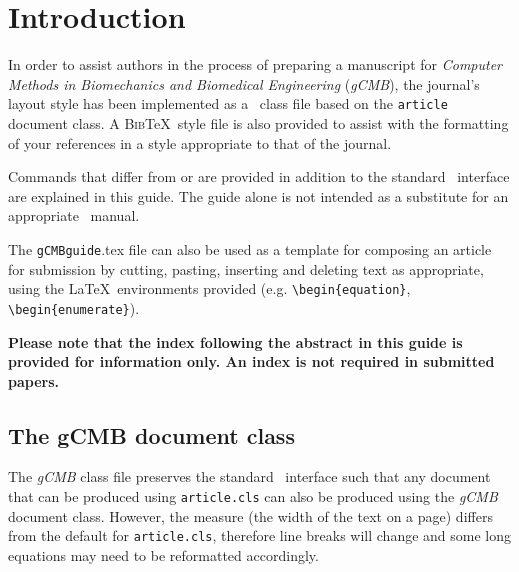 \documentclass{gCMB2e}
\begin{document}
\section{Introduction}

In order to assist authors in the process of preparing a manuscript for {\itshape Computer Methods in Biomechanics and Biomedical Engineering} ({\it gCMB}), the journal's layout style has been implemented as a \LaTeXe\ class file based on the {\tt article} document class. A \textsc{Bib}\TeX\ style file is also provided to assist with the formatting of your references in a style appropriate to that of the journal.

Commands that differ from or are provided in addition to the standard \LaTeXe\ interface are explained in this guide. The guide alone is not intended as a substitute for an appropriate \LaTeXe\ manual.

The {\tt gCMBguide}.tex file can also be used as a template for composing an article for submission by cutting, pasting, inserting and
deleting text as appropriate, using the \LaTeX\ environments provided (e.g. \verb"\begin{equation}", \verb"\begin{enumerate}").

{\bf{Please note that the index following the abstract in this guide is provided for information only. An index is not required in submitted papers.}}


\subsection{The {\bi gCMB} document class}\label{S1.1}

The {\it gCMB} class file preserves the standard \LaTeXe\ interface such that any document that can
be produced using {\tt article.cls} can also be produced using the {\it gCMB} document class.
However, the measure (the width of the text on a page) differs from the default for {\tt article.cls}, therefore line breaks
will change and some long equations may need to be reformatted accordingly.
\end{document}
